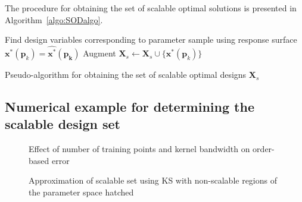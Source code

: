The procedure for obtaining the set of scalable optimal solutions is presented in Algorithm~\ref{algo:SODalgo}.

\begin{algorithm}
	\DontPrintSemicolon %
	 {

		 {
			Find design variables corresponding to parameter sample using response surface $\mathbf{x}^*(\mathbf{p}_k) = \hat{\mathbf{x}^*}(\mathbf{p_k})$\;
			Augment $\mathbf{X}_s \gets \mathbf{X}_s \cup \{ \mathbf{x}^*(\mathbf{p}_k) \} $\;
		}
	}
	\caption{Pseudo-algorithm for obtaining the set of scalable optimal designs $\mathbf{X}_s$}
	\label{algo:SODalgo}
\end{algorithm}

\subsection{Numerical example for determining the scalable design set} \label{subsec:numex}

\begin{figure*}[h!]
	\centering
	 \hspace{0.07\textwidth}%
	\caption{Effect of number of training points and kernel bandwidth on order-based error}
	\label{fig:HPeffect}
\end{figure*}

\begin{figure*}[h!]
	\centering
	 \hspace{0.07\textwidth}%
	\caption{Approximation of scalable set using \ac{KS} with non-scalable regions of the parameter space hatched}
	\label{fig:testfun}
\end{figure*}

